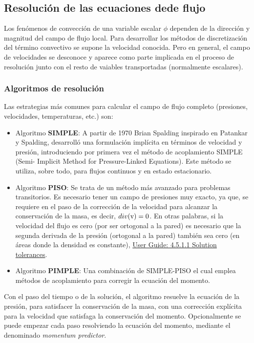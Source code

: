\subsection{Resolución de las ecuaciones dede flujo}\label{header-n407}

Los fenómenos de convección de una variable escalar \(\phi\) dependen de
la dirección y magnitud del campo de flujo local. Para desarrollar los
métodos de discretización del término convectivo se supone la velocidad
conocida. Pero en general, el campo de velocidades se desconoce y
aparece como parte implicada en el proceso de resolución junto con el
resto de vaiables transportadas (normalmente escalares).

\subsubsection{Algoritmos de resolución}\label{header-n412}

Las estrategias más comunes para calcular el campo de flujo completo
(presiones, velocidades, temperaturas, etc.) son:

\begin{itemize}
\item
  Algoritmo \textbf{SIMPLE}: A partir de 1970 Brian Spalding inspirado
  en Patankar y Spalding, desarrolló una formulación implícita en
  términos de velocidad y presión, introduciendo por primera vez el
  método de acoplamiento SIMPLE (Semi- Implicit Method for
  Pressure-Linked Equations). Este método se utiliza, sobre todo, para
  flujos continuos y en estado estacionario.
\item
  Algoritmo \textbf{PISO}: Se trata de un método más avanzado para
  problemas transitorios. Es necesario tener un campo de presiones muy
  exacto, ya que, se requiere en el paso de la corrección de la
  velocidad para alcanzar la conservación de la masa, es decir,
  \(div(\text v)=0\). En otras palabras, si la velocidad del flujo es
  cero (por ser ortogonal a la pared) es necesario que la segunda
  derivada de la presión (ortogonal a la pared) también sea cero (en
  áreas donde la densidad es constante),
  \href{https://cfd.direct/openfoam/user-guide/fvSolution/\#x21-1170004.5}{User
  Guide: 4.5.1.1 Solution tolerances}.
\item
  Algoritmo \textbf{PIMPLE}: Una combinación de SIMPLE-PISO el cual
  emplea métodos de acoplamiento para corregir la ecuación del momento.
\end{itemize}

Con el paso del tiempo o de la solución, el algoritmo resuelve la
ecuación de la presión, para satisfacer la conservación de la masa, con
una corrección explícita para la velocidad que satisfaga la conservación
del momento. Opcionalmente se puede empezar cada paso resolviendo la
ecuación del momento, mediante el denominado \emph{momentum predictor}.

